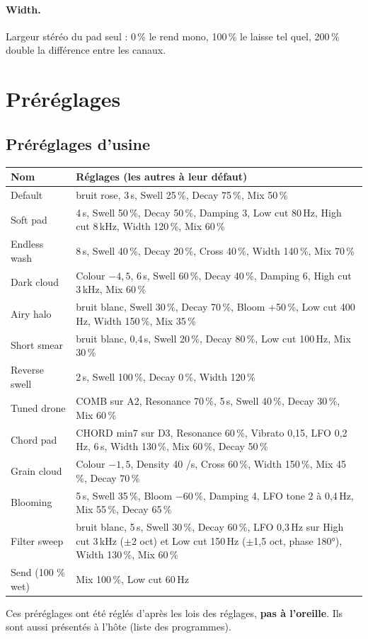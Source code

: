 \documentclass[a4paper,11pt]{article}
\begin{document}
\paragraph{Width.} Largeur stéréo du pad seul : 0\,\% le rend mono, 100\,\% le laisse tel quel,
200\,\% double la différence entre les canaux.

\section{Préréglages}\label{sec:prereglages}

\subsection{Préréglages d'usine}
\begin{center}
\small
\begin{tabularx}{\textwidth}{@{}l X@{}}
\toprule
Nom & Réglages (les autres à leur défaut) \\
\midrule
Default & bruit rose, 3\,s, Swell 25\,\%, Decay 75\,\%, Mix 50\,\% \\
Soft pad & 4\,s, Swell 50\,\%, Decay 50\,\%, Damping 3, Low cut 80\,Hz, High cut 8\,kHz, Width 120\,\%, Mix 60\,\% \\
Endless wash & 8\,s, Swell 40\,\%, Decay 20\,\%, Cross 40\,\%, Width 140\,\%, Mix 70\,\% \\
Dark cloud & Colour $-4{,}5$, 6\,s, Swell 60\,\%, Decay 40\,\%, Damping 6, High cut 3\,kHz, Mix 60\,\% \\
Airy halo & bruit blanc, Swell 30\,\%, Decay 70\,\%, Bloom +50\,\%, Low cut 400\,Hz, Width 150\,\%, Mix 35\,\% \\
Short smear & bruit blanc, 0,4\,s, Swell 20\,\%, Decay 80\,\%, Low cut 100\,Hz, Mix 30\,\% \\
Reverse swell & 2\,s, Swell 100\,\%, Decay 0\,\%, Width 120\,\% \\
Tuned drone & COMB sur A2, Resonance 70\,\%, 5\,s, Swell 40\,\%, Decay 30\,\%, Mix 60\,\% \\
Chord pad & CHORD min7 sur D3, Resonance 60\,\%, Vibrato 0,15, LFO 0,2\,Hz, 6\,s, Width 130\,\%, Mix 60\,\%, Decay 50\,\% \\
Grain cloud & Colour $-1{,}5$, Density 40 /s, Cross 60\,\%, Width 150\,\%, Mix 45\,\%, Decay 70\,\% \\
Blooming & 5\,s, Swell 35\,\%, Bloom $-60$\,\%, Damping 4, LFO tone 2 à 0,4\,Hz, Mix 55\,\%, Decay 65\,\% \\
Filter sweep & bruit blanc, 5\,s, Swell 30\,\%, Decay 60\,\%, LFO 0,3\,Hz sur High cut 3\,kHz ($\pm$2 oct) et Low cut 150\,Hz ($\pm$1,5 oct, phase 180°), Width 130\,\%, Mix 60\,\% \\
Send (100 \% wet) & Mix 100\,\%, Low cut 60\,Hz \\
\bottomrule
\end{tabularx}
\end{center}
Ces préréglages ont été réglés d'après les lois des réglages, \textbf{pas à l'oreille}. Ils sont
aussi présentés à l'hôte (liste des programmes).
\end{document}
